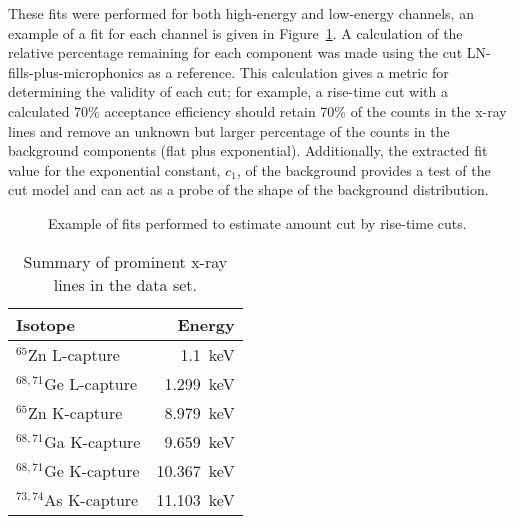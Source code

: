 These fits were performed for both high-energy and low-energy channels, an example of a fit for each channel is given in Figure~\ref{fig:BeGeFitExample}.  A calculation of the relative percentage remaining for each component was made using the cut LN-fills-plus-microphonics as a reference.  This calculation gives a metric for determining the validity of each cut; for example, a rise-time cut with a calculated 70\% acceptance efficiency should retain 70\% of the counts in the x-ray lines and remove an unknown but larger percentage of the counts in the background components (flat plus exponential).  Additionally, the extracted fit value for the exponential constant, $c_{1}$, of the background provides a test of the cut model and can act as a probe of the shape of the background distribution.  
	
					\begin{figure}
						\centering
						
						\caption[Example of fits performed to estimate amount cut by rise-time cuts]
						{Example of fits performed to estimate amount cut by rise-time cuts.}
						\label{fig:BeGeFitExample}
					\end{figure}
	
					\begin{table}
					\centering
						\begin{tabular}{l|r}
							Isotope & Energy \\
							\hline
							\hline
							$^{65}$Zn L-capture & 1.1~keV \\
							\hline
							$^{68,71}$Ge L-capture & 1.299~keV \\
							\hline
							$^{65}$Zn K-capture & 8.979~keV \\
							\hline
							$^{68,71}$Ga K-capture & 9.659~keV \\
							\hline
							$^{68,71}$Ge K-capture & 10.367~keV \\
							\hline
							$^{73,74}$As K-capture & 11.103~keV \\
							\hline
							\hline
						\end{tabular}	
						\caption[Summary of prominent x-ray lines in the BeGe data set]
						{Summary of prominent x-ray lines in the data set.}
						\label{tab:XRayLines}
					\end{table}


